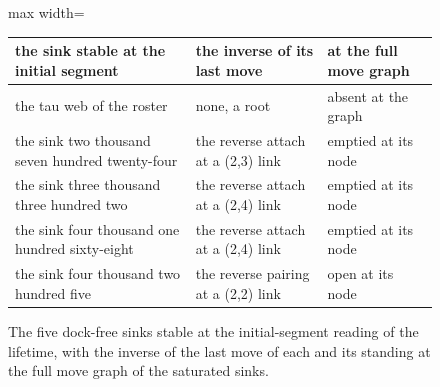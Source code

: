 \begin{figure}[h]\centering
\begin{adjustbox}{max width=\linewidth}\begin{tabular}{lll}\toprule
the sink stable at the initial segment & the inverse of its last move & at the full move graph \\ \midrule
the tau web of the roster & none, a root & absent at the graph \\
the sink two thousand seven hundred twenty-four & the reverse attach at a (2,3) link & emptied at its node \\
the sink three thousand three hundred two & the reverse attach at a (2,4) link & emptied at its node \\
the sink four thousand one hundred sixty-eight & the reverse attach at a (2,4) link & emptied at its node \\
the sink four thousand two hundred five & the reverse pairing at a (2,2) link & open at its node \\ \bottomrule
\end{tabular}\end{adjustbox}
\caption{The five dock-free sinks stable at the initial-segment reading of the lifetime, with the inverse of the last move of each and its standing at the full move graph of the saturated sinks.}
\end{figure}
